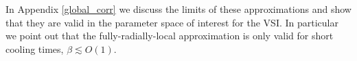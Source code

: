  In Appendix \ref{global_corr}  we discuss the limits of these approximations
 and show that they are valid in the parameter space of interest for the VSI.
In particular we point out that the fully-radially-local approximation is only valid for
short cooling times, $\beta \lesssim O(1)$.





